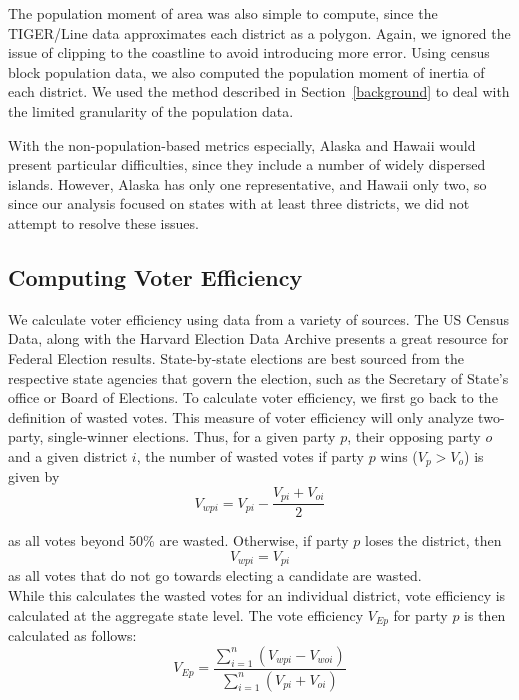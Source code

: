 \documentclass[12pt]{article}
\begin{document}
  The population moment of area was also simple to compute, since the TIGER/Line data approximates each district as a polygon.  Again, we ignored the issue of clipping to the coastline to avoid introducing more error.  Using census block population data, we also computed the population moment of inertia of each district.  We used the method described in Section~\ref{background} to deal with the limited granularity of the population data.


  With the non-population-based metrics especially, Alaska and Hawaii would present particular difficulties, since they include a number of widely dispersed islands.  However, Alaska has only one representative, and Hawaii only two, so since our analysis focused on states with at least three districts, we did not attempt to resolve these issues.

  \subsection {Computing Voter Efficiency}
  We calculate voter efficiency using data from a variety of sources.  The US Census Data, along with the Harvard Election Data Archive presents a great resource for Federal Election results.  State-by-state elections are best sourced from the respective state agencies that govern the election, such as the Secretary of State's office or Board of Elections.  To calculate voter efficiency, we first go back to the definition of wasted votes.  This measure of voter efficiency will only analyze two-party, single-winner elections.  Thus, for a given party $p$, their opposing party $o$ and a given district $i$, the number of wasted votes  if party $p$ wins ($V_{p} > V_{o}$)  is given by 
    \[ V_{wpi} = V_{pi} - \frac{V_{pi}+V_{oi}}{2}\]
    
    as all votes beyond 50\% are wasted. Otherwise, if party $p$ loses the district, then
    \[V_{wpi} = V_{pi}\]
    as all votes that do not go towards electing a candidate are wasted.\\
    
    While this calculates the wasted votes for an individual district, vote efficiency is calculated at the aggregate state level.  The vote efficiency $V_{Ep}$ for party $p$ is then calculated as follows:
     \[V_{Ep} = \frac{\sum_{i=1}^{n}(V_{wpi}-V_{woi})}{\sum_{i=1}^{n}(V_{pi}+V_{oi})}\]
     
\end{document}
